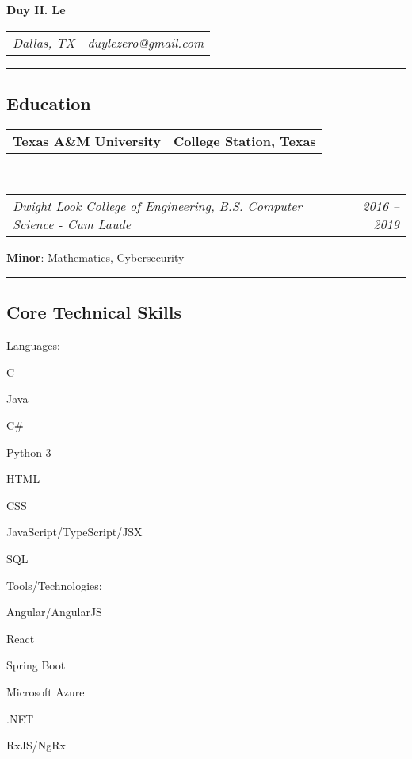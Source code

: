 \documentclass[10pt,letterpaper]{article}
\makeatletter
\newenvironment{indentsection}[1]%
{\begin{list}{}%
	{\setlength{\leftmargin}{#1}}%
	\item[]%
}
{\end{list}}
\newcommand{\headerrow}[2]
{\begin{tabular*}{\linewidth}{l@{\extracolsep{\fill}}r}
	#1 &
	#2 \\
\end{tabular*}}
\newcommand{\CPP}
{C\nolinebreak[4]\hspace{-.05em}\raisebox{.22ex}{\footnotesize\bf ++}}
\makeatother
\begin{document}
\begin{center}
{\LARGE \textbf{Duy H. Le}}
\end{center}
	\headerrow
		{\emph{Dallas, TX}}
		{\emph{duylezero@gmail.com}}
\hrule
\vspace{-0.8em}
\subsection*{Education}

	\headerrow
		{\textbf{Texas A\&M University}}
		{\textbf{College Station, Texas}}
	\\
	\headerrow
		{\emph{Dwight Look College of Engineering, B.S. Computer Science - Cum Laude}}
		{\emph{2016 -- 2019}}
	\vspace{-0.4em}
		 \textbf{Minor}: Mathematics, Cybersecurity \\

\hrule
\vspace{-0.8em}
\subsection*{Core Technical Skills}
\vspace{-0.4em}
\begin{indentsection}{\parindent}
\begin{description*}
	\item[Languages:]
	\begin{inparaitem}[\ * \ ]
 		\CPP \ 
		\item Java
		\item C\#
		\item Python 3
		\item HTML
		\item CSS
		\item JavaScript/TypeScript/JSX
		\item SQL
	\end{inparaitem}
	\item[Tools/Technologies:]
		\begin{inparaitem}[\ * \ ]
 		 Angular/AngularJS
		\item React 
		\item Spring Boot
		\item Microsoft Azure
		\item .NET
		\item RxJS/NgRx
	\end{inparaitem}
\end{description*}
\end{indentsection}
\end{document}
